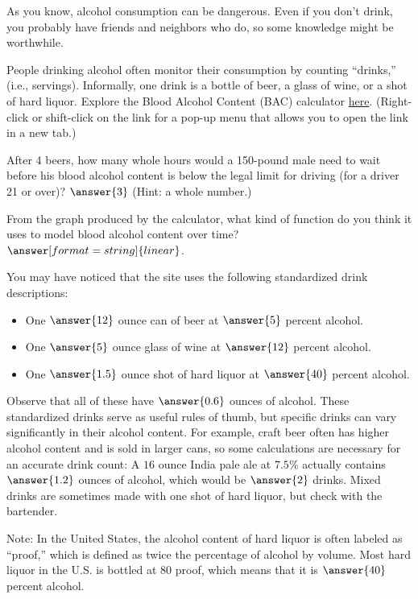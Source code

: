 \documentclass{ximera}
\begin{document}
\begin{question}
As you know, alcohol consumption can be dangerous.  Even if you don't drink, you probably have friends and neighbors who do, so some knowledge might be worthwhile.  

People drinking alcohol often monitor their consumption by counting ``drinks,'' (i.e., servings).  Informally, one drink is a bottle of beer, a glass of wine, or a shot of hard liquor.  Explore the Blood Alcohol Content (BAC) calculator \href{https://www.calculator.net/bac-calculator.html}{here}. (Right-click or shift-click on the link for a pop-up menu that allows you to open the link in a new tab.) 

After 4 beers, how many whole hours would a 150-pound male need to wait before his blood alcohol content is below the legal limit for driving (for a driver 21 or over)?  $\answer{3}$ (Hint: a whole number.)  

From the graph produced by the calculator, what kind of function do you think it uses to model blood alcohol content over time?  $\answer[format=string]{linear}$.  

You may have noticed that the site uses the following standardized drink descriptions:  

\begin{itemize}
\item One $\answer{12}$ ounce can of beer at $\answer{5}$ percent alcohol. 
\item One $\answer{5}$ ounce glass of wine at $\answer{12}$ percent alcohol. 
\item One $\answer{1.5}$ ounce shot of hard liquor at $\answer{40}$ percent alcohol.  
\end{itemize}

Observe that all of these have $\answer{0.6}$ ounces of alcohol.  These standardized drinks serve as useful rules of thumb, but specific drinks can vary significantly in their alcohol content.  For example, craft beer often has higher alcohol content and is sold in larger cans, so some calculations are necessary for an accurate drink count:  A $16$ ounce India pale ale at $7.5\%$ actually contains $\answer{1.2}$ ounces of alcohol, which would be $\answer{2}$ drinks.  Mixed drinks are sometimes made with one shot of hard liquor, but check with the bartender.  

Note: In the United States, the alcohol content of hard liquor is often labeled as ``proof,'' which is defined as twice the percentage of alcohol by volume.  Most hard liquor in the U.S. is bottled at 80 proof, which means that it is $\answer{40}$ percent alcohol.  


\end{question}
\end{document}
